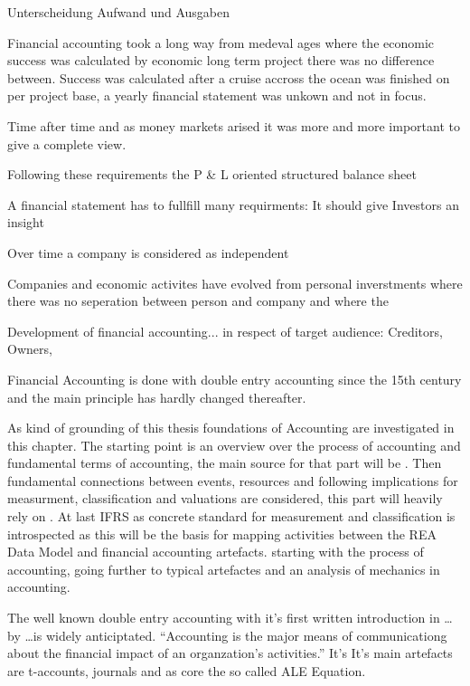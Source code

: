 Unterscheidung Aufwand und Ausgaben


Financial accounting took a long way from medeval ages where the economic success was calculated by economic long term project there was no difference between. Success was calculated after a cruise accross the ocean was finished on per project base, a yearly financial statement was unkown and not in focus.

Time after time and as money markets arised it was more and more important to give a complete view.


Following these requirements the P \& L oriented structured balance sheet 

A financial statement has to fullfill many requirments: It should give Investors an insight

Over time a company is considered as independent 


Companies and economic activites have evolved from personal inverstments where there was no seperation between person and company and where the 

Development of financial accounting... in respect of target audience: Creditors, Owners, 





Financial Accounting is done with double entry accounting since the 15th century  and the main principle has hardly changed thereafter.







As kind of grounding of this thesis foundations of Accounting are investigated in this chapter.
The starting point is an overview over the process of accounting and fundamental terms of accounting, the main source for that part will be \cite{Horngren1984}.
Then fundamental connections between events, resources and following implications for measurment, classification and valuations are considered, this part will heavily rely on \cite{Ijiri1967}.
At last IFRS as concrete standard for measurement and classification is introspected as this will be the basis for mapping activities between the REA Data Model and financial accounting artefacts.
starting with the process of accounting, going further to typical artefactes and an analysis of mechanics in accounting.

The well known double entry accounting with it's first written introduction in \ldots by \ldots is widely anticiptated. %
\enquote{Accounting is the major means of communicationg about the financial impact of an organzation's activities.}\cite[p.3]{Horngren1984}
It's
It's main artefacts are t-accounts, journals and as core the so called ALE Equation.

